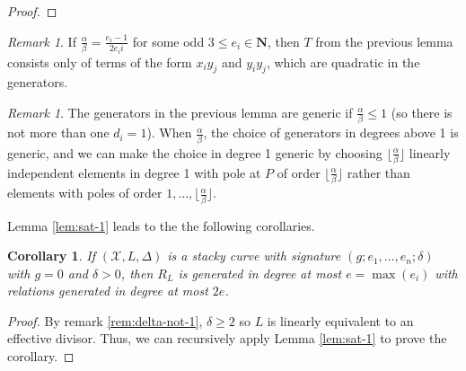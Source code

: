 \documentclass{amsart}
\theoremstyle{plain}
\newtheorem{cor}[thm]{Corollary}
\theoremstyle{definition}
\theoremstyle{remark}
\newtheorem{rem}[thm]{Remark}
\numberwithin{equation}{section}
\newcommand \sx{\mathscr X}
\newcommand \halfcan{L}
\begin{document}
\begin{proof}



\end{proof}

\begin{rem}\label{rem:quad-gen}
If $\frac{\alpha}{\beta}=\frac{e_i-1}{2 e_ii}$ for some odd $3\le e_i\in \mathbf{N}$, then $T$ from the previous lemma consists only of terms of the form $x_i y_j$ and $y_i y_j$, which are quadratic in the generators.
\end{rem}


\begin{rem}\label{rem:sat-1-gen-lem-generic}
The generators in the previous lemma are generic if $\frac{\alpha}{\beta}\le 1$ (so there is not more than one $d_i=1$).  When $\frac{\alpha}{\beta}$, the choice of generators in degrees above 1 is generic, and we can make the choice in degree 1 generic by choosing $\lfloor \frac{\alpha}{\beta}\rfloor$ linearly independent elements in degree 1 with pole at $P$ of order $\lfloor \frac{\alpha}{\beta}\rfloor$ rather than elements with poles of order $1, \ldots, \lfloor \frac{\alpha}{\beta}\rfloor$.
\end{rem}

Lemma \ref{lem:sat-1} leads to the the following corollaries.
\begin{cor}\label{cor-gen-0-with-log}
If $(\sx, \halfcan, \Delta)$ is a stacky curve with signature $(g; e_1, \ldots, e_n; \delta)$ with $g=0$ and $\delta>0$, then $R_\halfcan$ is generated in degree at most $e=\max(e_i)$ with relations generated in degree at most $2e$.
\end{cor}
\begin{proof}
By remark \ref{rem:delta-not-1}, $\delta\ge 2$ so $\halfcan$ is linearly equivalent to an effective divisor.  Thus, we can recursively apply Lemma \ref{lem:sat-1} to prove the corollary.
\end{proof}
\end{document}
